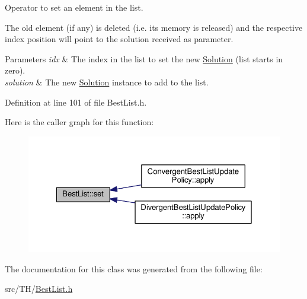 Operator to set an element in the list. 

The old element (if any) is deleted (i.\+e. its memory is released) and the respective index position will point to the solution received as parameter.


\begin{DoxyParams}{Parameters}
{\em idx} & The index in the list to set the new \hyperlink{classSolution}{Solution} (list starts in zero). \\
\hline
{\em solution} & The new \hyperlink{classSolution}{Solution} instance to add to the list. \\
\hline
\end{DoxyParams}


Definition at line 101 of file Best\+List.\+h.



Here is the caller graph for this function\+:
\nopagebreak
\begin{figure}[H]
\begin{center}
\leavevmode
\includegraphics[width=350pt]{classBestList_a4a5650fb72c71d6027540daa96de0d39_icgraph}
\end{center}
\end{figure}




The documentation for this class was generated from the following file\+:\begin{DoxyCompactItemize}
\item 
src/\+T\+H/\hyperlink{BestList_8h}{Best\+List.\+h}\end{DoxyCompactItemize}
